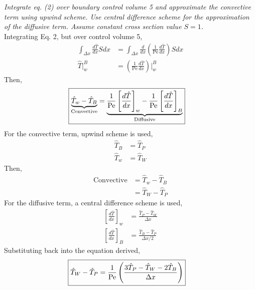 \section{}
\textit{Integrate eq. (2) over boundary control volume 5 and approximate the convective term using upwind scheme. Use central difference scheme for the approximation of the diffusive term. Assume constant cross section value $S = 1$.} \\

Integrating Eq. 2, but over control volume 5,
\begin{align*}
    \int_{\Delta x} \frac{d \hat{T}}{dx} S dx &= \int_{\Delta x} \frac{d}{dx}\left(\frac{1}{\text{Pe}} \frac{d \hat{T}}{dx}\right) S dx \\
    \hat{T} \bigg|_{w}^{B} &= \left(\frac{1}{\text{Pe}} \frac{d \hat{T}}{dx}\right) \bigg|_{w}^{B}
\end{align*}
Then,
\begin{align*}
    \Aboxed{\underbrace{\hat{T}_w - \hat{T}_B}_{\text{Convective}} &= \underbrace{\frac{1}{\text{Pe}} \left[\frac{d \hat{T}}{dx}\right]_w - \frac{1}{\text{Pe}} \left[\frac{d \hat{T}}{dx}\right]_B}_{\text{Diffusive}}}
\end{align*}
For the convective term, upwind scheme is used,
\begin{align*}
    \hat{T}_B &= \hat{T}_P \\
    \hat{T}_w &= \hat{T}_W 
\end{align*}
Then,
\begin{align*}
    \text{Convective} &= \hat{T}_w - \hat{T}_B \\
    &= \hat{T}_W - \hat{T}_P
\end{align*}
For the diffusive term, a central difference scheme is used,
\begin{align*}
    \left[\frac{d \hat{T}}{dx}\right]_w &= \frac{\hat{T}_P - \hat{T}_W}{\Delta x} \\
    \left[\frac{d \hat{T}}{dx}\right]_B &= \frac{\hat{T}_B - \hat{T}_P}{\Delta x/2}
\end{align*}
Substituting back into the equation derived,
\begin{align*}
    \Aboxed{\hat{T}_W - \hat{T}_P &= \frac{1}{\text{Pe}} \left(\frac{3 \hat{T}_P - \hat{T}_W - 2 \hat{T}_B}{\Delta x}\right)} 
\end{align*}